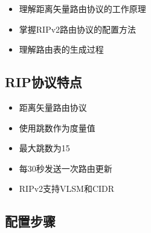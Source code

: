 \documentclass[12pt,a4paper]{ctexart}
\begin{document}
\begin{itemize}[leftmargin=2em,itemsep=0pt]
    \item 理解距离矢量路由协议的工作原理
    \item 掌握RIPv2路由协议的配置方法
    \item 理解路由表的生成过程
\end{itemize}

\subsection{RIP协议特点}

\begin{itemize}[leftmargin=2em,itemsep=0pt]
    \item 距离矢量路由协议
    \item 使用跳数作为度量值
    \item 最大跳数为15
    \item 每30秒发送一次路由更新
    \item RIPv2支持VLSM和CIDR
\end{itemize}

\subsection{配置步骤}
\end{document}

